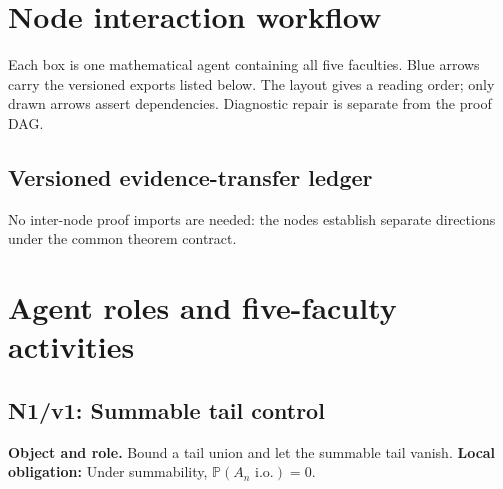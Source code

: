 \documentclass[preprint,12pt,aps,pra,showkeys,amsmath,amssymb,superscriptaddress,floatfix]{revtex4-2}
\theoremstyle{definition}
\theoremstyle{remark}
\newcommand{\field}[2]{\par\smallskip\noindent\textbf{#1.} #2\par}
\begin{document}
\clearpage\section{Node interaction workflow}

\begin{center}\end{center}

Each box is one mathematical agent containing all five faculties. Blue
arrows carry the versioned exports listed below. The layout gives a
reading order; only drawn arrows assert dependencies. Diagnostic repair
is separate from the proof DAG.

\subsection{Versioned evidence-transfer ledger}
No inter-node proof imports are needed: the nodes establish separate directions under the common theorem contract.


\begingroup\small\linespread{1.05}\selectfont

\endgroup

\clearpage\section{Agent roles and five-faculty activities}\begingroup\small\linespread{1.05}\selectfont{}

\subsection{N1/v1: Summable tail control}

\field{Object and role}{Bound a tail union and let the summable tail vanish. \textbf{Local
obligation:} Under summability, \(\mathbb P(A_n\text{ i.o.})=0\).}
\end{document}
